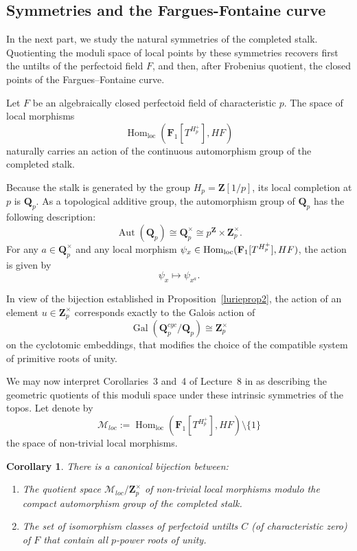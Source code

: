 \documentclass[11pt,a4paper]{article}
\newtheorem{corollary}[theorem]{Corollary}
\newcommand{\Q}{\mathbf{Q}}
\newcommand{\Z}{\mathbf{Z}}
\newcommand{\Fone}{\mathbf{F}_{1}}
\newcommand{\Hom}{{\rm{Hom}}}
\begin{document}
\subsection{Symmetries and the Fargues-Fontaine curve}\label{ffcurve}

In the next part, we study the natural symmetries of the completed stalk. Quotienting the moduli space of local points by these symmetries recovers first the untilts of the perfectoid field $F$, and then, after Frobenius quotient, the closed points of the Fargues--Fontaine curve.\vspace{.05in}

Let $F$ be an algebraically closed perfectoid field of characteristic $p$. 
The space of  local morphisms 
\[
\operatorname{Hom}_{\mathrm{loc}}(\Fone[T^{H_p^+}], HF)
\]
naturally carries an action of the continuous automorphism group of the completed stalk.

Because the stalk is generated by the group $H_p=\Z[1/p]$, its local completion at $p$ is $\Q_p$. 
As a topological additive group, the automorphism group of $\Q_p$ has the following description:
\[
\operatorname{Aut}(\Q_p) 
\cong 
\Q_p^\times 
\cong 
p^\Z \times \Z_p^\times.
\]
For any $a\in\Q_p^\times$ and any local morphism 
$\psi_x\in\Hom_{\mathrm{loc}}(\Fone[T^{H_p^+}],HF)$, 
the action is given by
\[
\psi_x \longmapsto \psi_{x^a}.
\]

In view of the bijection established in Proposition~\ref{lurieprop2}, 
the action of an element 
$u\in\Z_p^\times$ 
corresponds exactly to the Galois action of
\[
\operatorname{Gal}(\Q_p^{cyc}/\Q_p)
\cong 
\Z_p^\times
\]
on the cyclotomic embeddings, that modifies the choice of the compatible system of primitive roots of unity.\vspace{.05in}

We may now interpret Corollaries~3 and~4 of Lecture~8 in \cite{Lurie}
as describing the geometric quotients of this moduli space under these intrinsic symmetries of the topos.
Let denote by
$$
\mathcal{M}_{loc}:=\operatorname{Hom}_{\mathrm{loc}}(\Fone[T^{H_p^+}], HF)\setminus\{1\}
$$
the space of  non-trivial local morphisms.
\begin{corollary}\label{luriecor3}
There is a canonical bijection between:
\begin{enumerate}
    \item The quotient space 
    $\mathcal{M}_{loc}/ \Z_p^\times$ 
    of non-trivial local morphisms modulo the compact automorphism group of the completed stalk.
    
    \item The set of isomorphism classes of perfectoid untilts $C$ (of characteristic zero) of $F$ that contain all $p$-power roots of unity.
\end{enumerate}
\end{corollary}
\end{document}
